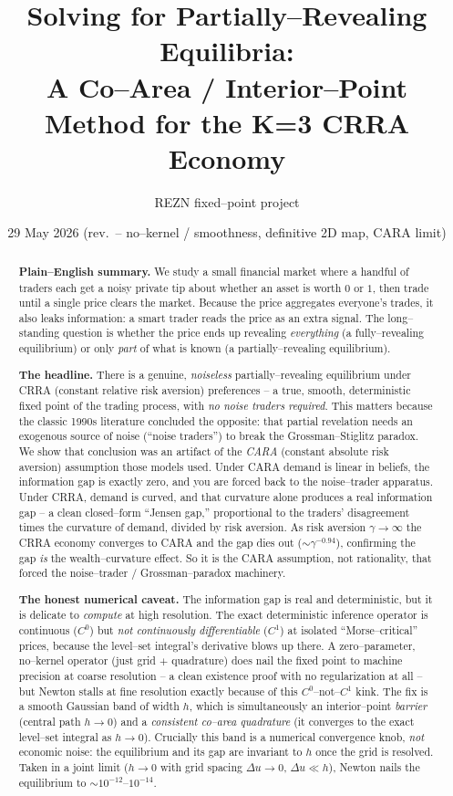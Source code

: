 \documentclass[11pt]{article}
\title{\textbf{Solving for Partially--Revealing Equilibria:\\
A Co--Area / Interior--Point Method for the K=3 CRRA Economy}}
\author{REZN fixed--point project}
\date{29 May 2026 (rev.\ -- no--kernel / smoothness, definitive 2D map, CARA limit)}
\begin{document}
\maketitle

\begin{abstract}
\noindent
\textbf{Plain--English summary.}
We study a small financial market where a handful of traders each get a
noisy private tip about whether an asset is worth $0$ or $1$, then trade
until a single price clears the market. Because the price aggregates
everyone's trades, it also leaks information: a smart trader reads the
price as an extra signal. The long--standing question is whether the price
ends up revealing \emph{everything} (a fully--revealing equilibrium) or only
\emph{part} of what is known (a partially--revealing equilibrium).

\textbf{The headline.} There is a genuine, \emph{noiseless}
partially--revealing equilibrium under CRRA (constant relative risk
aversion) preferences -- a true, smooth, deterministic fixed point of the
trading process, with \emph{no noise traders required}. This matters because
the classic 1990s literature concluded the opposite: that partial revelation
needs an exogenous source of noise (``noise traders'') to break the
Grossman--Stiglitz paradox. We show that conclusion was an artifact of the
\emph{CARA} (constant absolute risk aversion) assumption those models used.
Under CARA demand is linear in beliefs, the information gap is exactly zero,
and you are forced back to the noise--trader apparatus. Under CRRA, demand is
curved, and that curvature alone produces a real information gap -- a clean
closed--form ``Jensen gap,'' proportional to the traders' disagreement times
the curvature of demand, divided by risk aversion. As risk aversion
$\gamma\to\infty$ the CRRA economy converges to CARA and the gap dies out
($\sim\gamma^{-0.94}$), confirming the gap \emph{is} the wealth--curvature
effect. So it is the CARA assumption, not rationality, that forced the
noise--trader / Grossman--paradox machinery.

\textbf{The honest numerical caveat.} The information gap is real and
deterministic, but it is delicate to \emph{compute} at high resolution. The
exact deterministic inference operator is continuous ($C^0$) but \emph{not
continuously differentiable} ($C^1$) at isolated ``Morse--critical'' prices,
because the level--set integral's derivative blows up there. A zero--parameter,
no--kernel operator (just grid $+$ quadrature) does nail the fixed point to
machine precision at coarse resolution -- a clean existence proof with no
regularization at all -- but Newton stalls at fine resolution exactly because
of this $C^0$--not--$C^1$ kink. The fix is a smooth Gaussian band of width
$h$, which is simultaneously an interior--point \emph{barrier} (central path
$h\to0$) and a \emph{consistent co--area quadrature} (it converges to the
exact level--set integral as $h\to0$). Crucially this band is a numerical
convergence knob, \emph{not} economic noise: the equilibrium and its gap are
invariant to $h$ once the grid is resolved. Taken in a joint limit ($h\to0$
with grid spacing $\Delta u\to0$, $\Delta u\ll h$), Newton nails the
equilibrium to $\sim10^{-12}$--$10^{-14}$.
\end{abstract}
\end{document}
